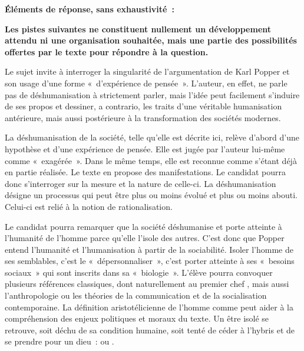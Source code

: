 {\textbf{Éléments de réponse, sans exhaustivité~:}

\textbf{Les pistes suivantes ne constituent nullement un développement attendu ni une organisation
souhaitée, mais une partie des possibilités offertes par le texte pour répondre à la question.}

Le sujet invite à interroger la singularité de l'argumentation de Karl Popper et son usage d'une
forme «~d'expérience de pensée~». L'auteur, en effet, ne parle pas de déshumanisation à
strictement parler, mais l'idée peut facilement s'induire de ses propos et dessiner, a contrario,
les traits d'une véritable humanisation antérieure, mais aussi postérieure à la transformation
des sociétés modernes.

La déshumanisation de la société, telle qu'elle est décrite ici, relève d'abord d'une hypothèse
et d'une expérience de pensée. Elle est jugée par l'auteur lui-même comme «~exagérée~».
Dans le même temps, elle est reconnue comme s'étant déjà en partie réalisée. Le texte en
propose des manifestations. Le candidat pourra donc s'interroger sur la mesure et la nature
de celle-ci. La déshumanisation désigne un processus qui peut être plus ou moins évolué et
plus ou moins abouti. Celui-ci est relié à la notion de rationalisation.

Le candidat pourra remarquer que la société déshumanise et porte atteinte à l'humanité de
l'homme parce qu'elle l'isole des autres. C'est donc que Popper entend l'humanité et
l'humanisation à partir de la sociabilité. Isoler l'homme de ses semblables, c'est le
«~dépersonnaliser~», c'est porter atteinte à ses «~besoins sociaux~» qui sont inscrits dans sa
«~biologie~». L'élève pourra convoquer plusieurs références classiques, dont naturellement au premier chef , mais aussi l'anthropologie ou les théories de la communication et de la
socialisation contemporaine. La définition aristotélicienne de l'homme comme  peut aider à la compréhension des enjeux politiques et moraux du texte. Un être
isolé se retrouve, soit déchu de sa condition humaine, soit tenté de céder à l'hybris et de se
prendre pour un dieu~:  ou .

}
